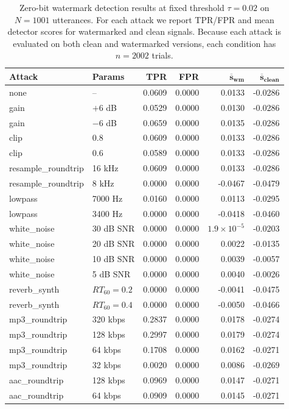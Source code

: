 \begin{table}[t]
\centering
\small
\caption{Zero-bit watermark detection results at fixed threshold $\tau=0.02$
on $N=1001$ utterances. For each attack we report TPR/FPR and mean detector
scores for watermarked and clean signals. Because each attack is evaluated on
both clean and watermarked versions, each condition has $n=2002$ trials.}
\label{tab:wm-robustness-full}
\begin{tabular}{l l r r r r}
\hline
\textbf{Attack} & \textbf{Params} &
\textbf{TPR} & \textbf{FPR} &
$\boldsymbol{\overline{s}_{wm}}$ & $\boldsymbol{\overline{s}_{clean}}$ \\
\hline
none & -- & 0.0609 & 0.0000 & 0.0133 & -0.0286 \\
gain & $+6$ dB & 0.0529 & 0.0000 & 0.0130 & -0.0286 \\
gain & $-6$ dB & 0.0659 & 0.0000 & 0.0135 & -0.0286 \\
clip & 0.8 & 0.0609 & 0.0000 & 0.0133 & -0.0286 \\
clip & 0.6 & 0.0589 & 0.0000 & 0.0133 & -0.0286 \\
resample\_roundtrip & 16 kHz & 0.0609 & 0.0000 & 0.0133 & -0.0286 \\
resample\_roundtrip & 8 kHz & 0.0000 & 0.0000 & -0.0467 & -0.0479 \\
lowpass & 7000 Hz & 0.0160 & 0.0000 & 0.0113 & -0.0295 \\
lowpass & 3400 Hz & 0.0000 & 0.0000 & -0.0418 & -0.0460 \\
white\_noise & 30 dB SNR & 0.0000 & 0.0000 & $1.9\times 10^{-5}$ & -0.0203 \\
white\_noise & 20 dB SNR & 0.0000 & 0.0000 & 0.0022 & -0.0135 \\
white\_noise & 10 dB SNR & 0.0000 & 0.0000 & 0.0039 & -0.0057 \\
white\_noise & 5 dB SNR & 0.0000 & 0.0000 & 0.0040 & -0.0026 \\
reverb\_synth & $RT_{60}=0.2$ & 0.0000 & 0.0000 & -0.0041 & -0.0475 \\
reverb\_synth & $RT_{60}=0.4$ & 0.0000 & 0.0000 & -0.0050 & -0.0466 \\
mp3\_roundtrip & 320 kbps & 0.2837 & 0.0000 & 0.0178 & -0.0274 \\
mp3\_roundtrip & 128 kbps & 0.2997 & 0.0000 & 0.0179 & -0.0274 \\
mp3\_roundtrip & 64 kbps & 0.1708 & 0.0000 & 0.0162 & -0.0271 \\
mp3\_roundtrip & 32 kbps & 0.0020 & 0.0000 & 0.0086 & -0.0269 \\
aac\_roundtrip & 128 kbps & 0.0969 & 0.0000 & 0.0147 & -0.0271 \\
aac\_roundtrip & 64 kbps & 0.0909 & 0.0000 & 0.0145 & -0.0271 \\
\hline
\end{tabular}
\end{table}

